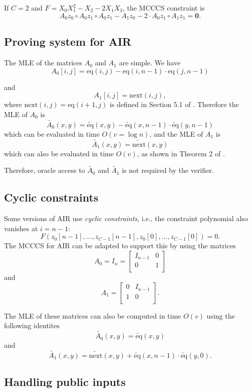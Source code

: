 \documentclass[a4paper]{article}
\begin{document}
If $C=2$ and $F = X_0 X_1^2 - X_2 - 2X_1X_3$, the MCCCS constraint is
$$
A_0 z_0 \circ A_0z_1 \circ A_0z_1 - A_1 z_0 -2\cdot A_0 z_1 \circ A_1z_1 = \mathbf{0}. 
$$

\subsection*{Proving system for AIR}
The MLE of the matrices $A_0$ and $A_1$ are simple. We have 
$$A_0[i,j] = \text{eq}(i,j)-\text{eq}(i,n-1)\cdot \text{eq}(j,n-1)$$

and 
$$A_1[i,j]=\text{next}(i,j),$$ where $\text{next}(i,j)=\text{eq}(i+1,j)$ is defined in Section 5.1 of \cite{cryptoeprint:2023/552}. Therefore the MLE of $A_0$ is 
$$\widetilde{A_0}(x,y) = \widetilde{\text{eq}}(x,y)-\widetilde{\text{eq}}(x,n-1)\cdot \widetilde{\text{eq}}(y,n-1)$$
which can be evaluated in time $O(v=\log n)$, and the MLE of $A_1$ is
$$\widetilde{A_1}(x,y) = \widetilde{\text{next}}(x,y)$$
which can also be evaluated in time $O(v)$, as shown in Theorem 2 of \cite{cryptoeprint:2023/552}.

Therefore, oracle access to $\widetilde{A_0}$ and $\widetilde{A_1}$ is not required by the verifier.

\subsection*{Cyclic constraints}

Some versions of AIR use \emph{cyclic constraints}, i.e., the constraint polynomial also vanishes at $i=n-1$:
$$
F(z_0[n-1],\dots,z_{C-1}[n-1],z_0[0],\dots,z_{C-1}[0])=0.
$$
The MCCCS for AIR can be adapted to support this by using the matrices 
$$ A_0 = I_n =
\begin{bmatrix}
I_{n-1} & 0 \\
0 & 1      \\
\end{bmatrix}
$$
and
$$
A_1 = 
\begin{bmatrix}
0 & I_{n-1} \\
1 & 0      \\
\end{bmatrix}.
$$

The MLE of these matrices can also be computed in time $O(v)$ using the following identites
$$ \widetilde{A_0}(x,y) = \widetilde{\text{eq}}(x,y) $$
and
$$\widetilde{A_1}(x,y) = \widetilde{\text{next}}(x,y) + \widetilde{\text{eq}}(x,n-1)\cdot \widetilde{\text{eq}}(y,0).$$

\subsection*{Handling public inputs}
\end{document}
